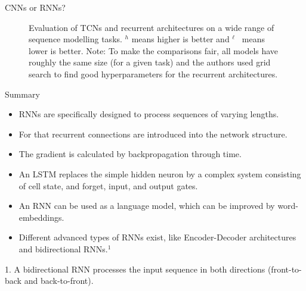 \begin{frame} {CNNs or RNNs?}
  \begin{figure}
      \centering
      \caption{\footnotesize{Evaluation of TCNs and recurrent architectures on a wide range of sequence modelling tasks. $^h$ means higher is better and ${}^\ell$~ means lower is better. Note: To make the comparisons fair, all models have roughly the same size (for a given task) and the authors used grid search to find good hyperparameters for the recurrent architectures.}}
  \end{figure}
\end{frame}


\begin{frame}{Summary}
\begin{itemize}
\item RNNs are specifically designed to process sequences of varying lengths. 
\item  For that recurrent connections are introduced into the network structure.
\item The gradient is calculated by backpropagation through time.
\item  An LSTM replaces the  simple hidden neuron by a complex system consisting of cell state, and forget, input, and output gates.
\item An RNN can be used as a language model, which can be improved by word-embeddings.
\item Different advanced types of RNNs exist, like Encoder-Decoder architectures and bidirectional RNNs.$^1$
\end{itemize}

\vspace{8mm}
\tiny{1. A bidirectional RNN processes the input sequence in both directions (front-to-back and back-to-front).}

\end{frame}

